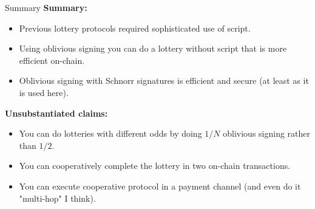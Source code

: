 \documentclass{beamer}
\begin{document}


\begin{frame}{Summary}
\textbf{Summary:}
\begin{itemize}
    \item<1-> Previous lottery protocols required sophisticated use of script.
    \item<2-> Using oblivious signing you can do a lottery without script that is more efficient on-chain.
    \item<3-> Oblivious signing with Schnorr signatures is efficient and secure (at least as it is used here).
\end{itemize}

\pause
\pause
\pause

\textbf{Unsubstantiated claims:}
\begin{itemize}
    \item You can do lotteries with different odds by doing $1/N$ oblivious signing rather than $1/2$.
    \item You can cooperatively complete the lottery in two on-chain transactions.
    \item You can execute cooperative protocol in a payment channel (and even do it "multi-hop" I think).
\end{itemize}

\end{frame}
\end{document}
